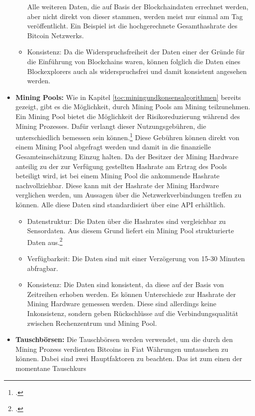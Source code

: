 \begin{itemize}
\begin{itemize}
        Alle weiteren Daten, die auf Basis der Blockchaindaten errechnet werden, aber nicht direkt von dieser stammen, werden
        meist nur einmal am Tag veröffentlicht. Ein Beispiel ist die hochgerechnete Gesamthashrate des Bitcoin Netzwerks.
        \item Konsistenz: Da die Widerspruchsfreiheit der Daten einer der Gründe für die Einführung von Blockchains waren,
        können folglich die Daten eines Blockexplorers auch als widerspruchsfrei und damit konsistent angesehen werden. 
    \end{itemize}
    \item \textbf{Mining Pools: }Wie in Kapitel \ref{toc:miningundkonsensalgorithmen} bereits gezeigt, gibt es die
    Möglichkeit, durch Mining Pools am Mining teilzunehmen. Ein Mining Pool bietet die Möglichkeit der Risikoreduzierung
    während des Mining Prozesses. Dafür verlangt dieser Nutzungsgebühren, die unterschiedlich bemessen sein
    können.\footcite[Vgl.][S. 59ff]{bhaskar2015bitcoin} Diese Gebühren können direkt von einem Mining Pool abgefragt werden
    und damit in die finanzielle Gesamteinschätzung Einzug halten. Da der Besitzer der Mining Hardware anteilig
    zu der zur Verfügung gestellten Hashrate am Ertrag des Pools beteiligt wird, ist bei einem Mining Pool die ankommende
    Hashrate nachvollziehbar. Diese kann mit der Hashrate der Mining Hardware verglichen werden, um Aussagen über die
    Netzwerkverbindungen treffen zu können. Alle diese Daten sind standardisiert über eine \ac{API} erhältlich.
    \begin{itemize}
        \item Datenstruktur: Die Daten über die Hashrates sind vergleichbar zu Sensordaten. Aus diesem Grund liefert ein
        Mining Pool strukturierte Daten aus.\footcite[Vgl.][S. 27]{kimble2015big}
        \item Verfügbarkeit: Die Daten sind mit einer Verzögerung von 15-30 Minuten abfragbar.
        \item Konsistenz: Die Daten sind konsistent, da diese auf der Basis von Zeitreihen erhoben werden. Es können
        Unterschiede zur Hashrate der Mining Hardware gemessen werden. Diese sind allerdings keine Inkonsistenz, sondern
        geben Rückschlüsse auf die Verbindungsqualität zwischen Rechenzentrum und Mining Pool.
    \end{itemize}
    \item \textbf{Tauschbörsen: }Die Tauschbörsen werden verwendet, um die durch den Mining Prozess verdienten Bitcoins in
    Fiat Währungen umtauschen zu können. Dabei sind zwei Hauptfaktoren zu beachten. Das ist zum einen der momentane Tauschkurs

\end{itemize}
